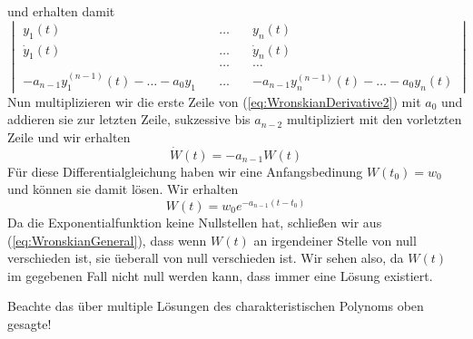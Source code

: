 und erhalten damit
\begin{equation}
  \begin{vmatrix}
           y_1(t)&\quad\dots\quad &y_n(t)\\
           \dot{y}_1(t)&\quad\dots\quad &\dot{y}_n(t)\\
                       &\quad\dots\quad&\dots\\
      -a_{n-1}y^{(n-1)}_1(t)-\dots-a_0y_1&\quad\dots\quad 
      &-a_{n-1}y^{(n-1)}_n(t)-\dots-a_0y_n(t)
         \end{vmatrix}
  \label{eq:WronskianDerivative2}
\end{equation}
Nun multiplizieren wir die erste Zeile von (\ref{eq:WronskianDerivative2}) mit
$a_0$ und addieren sie zur letzten Zeile, sukzessive bis $a_{n-2}$
multipliziert mit den vorletzten Zeile und wir erhalten
\begin{equation}
  \dot{W}(t)=-a_{n-1}W(t)
  \label{eq:WronskianDGL}
\end{equation}
Für diese Differentialgleichung haben wir eine Anfangsbedinung $W(t_0)=w_0$ und
können sie damit lösen. Wir erhalten
\begin{equation}
  W(t)=w_0e^{-a_{n-1}(t-t_0)}
  \label{eq:WronskianGeneral}
\end{equation}
Da die Exponentialfunktion keine Nullstellen hat, schließen wir aus
(\ref{eq:WronskianGeneral}), dass wenn $W(t)$ an irgendeiner Stelle von null
verschieden ist, sie üeberall von null verschieden ist. Wir sehen also, da
$W(t)$ im gegebenen Fall nicht null werden kann, dass immer eine Lösung
existiert.
\begin{note}{}
  Beachte das über multiple Lösungen des charakteristischen Polynoms oben
  gesagte!
\end{note}
